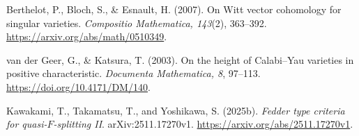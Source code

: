 Berthelot, P., Bloch, S., \& Esnault, H. (2007).
On Witt vector cohomology for singular varieties.
\emph{Compositio Mathematica, 143}(2), 363--392.
\url{https://arxiv.org/abs/math/0510349}.

van der Geer, G., \& Katsura, T. (2003).
On the height of Calabi--Yau varieties in positive characteristic.
\emph{Documenta Mathematica, 8}, 97--113.
\url{https://doi.org/10.4171/DM/140}.

Kawakami, T., Takamatsu, T., and Yoshikawa, S. (2025b).
\emph{Fedder type criteria for quasi-$F$-splitting II}.
arXiv:2511.17270v1.
\url{https://arxiv.org/abs/2511.17270v1}.
